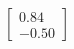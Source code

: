 \documentclass[preview]{standalone}
\begin{document}
\begin{align*}
\begin{bmatrix} 0.84 \\ -0.50 \end{bmatrix}
\end{align*}
\end{document}
